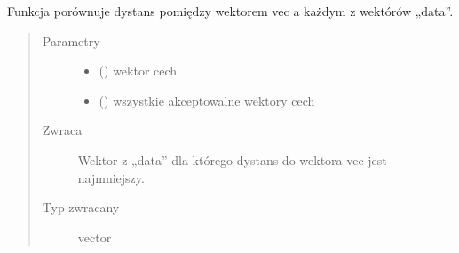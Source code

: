 \documentclass[letterpaper,10pt,polish]{sphinxmanual}
\begin{document}

\begin{fulllineitems}
\label{\detokenize{hmm_main:hmm_main.hmm_get_nearest_neighbour}}
Funkcja porównuje dystans pomiędzy wektorem vec a każdym z wektórów „data”.
\begin{quote}\begin{description}
\item[{Parametry}] \leavevmode\begin{itemize}
\item {} 
 () \textendash{} wektor cech

\item {} 
 (\sphinxstyleliteralemphasis{{[}}\sphinxstyleliteralemphasis{{]}}) \textendash{} wszystkie akceptowalne wektory cech

\end{itemize}

\item[{Zwraca}] \leavevmode
Wektor z „data” dla którego dystans do wektora vec jest najmniejszy.

\item[{Typ zwracany}] \leavevmode
vector

\end{description}\end{quote}

\end{fulllineitems}

\end{document}

